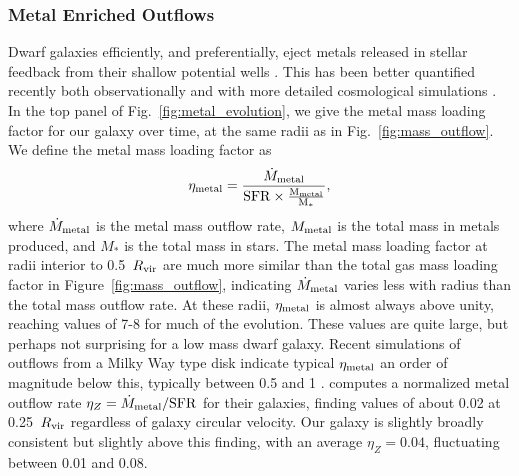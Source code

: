 \documentclass[twocolumn]{aastex61}
\begin{document}
\subsubsection{Metal Enriched Outflows}
Dwarf galaxies efficiently, and preferentially, eject metals released in stellar feedback from their shallow potential wells \citep{MacLowFerrara1999,FerraraTolstoy2000}. This has been better quantified recently both observationally \citep[e.g.][]{Kirby2011-metals,Zahid2012,Peeples2014,McQuinn2015} and with more detailed cosmological simulations \citep{Angles-Alcazar2017,Muratov2017}. In the top panel of Fig.~\ref{fig:metal_evolution}, we give the metal mass loading factor for our galaxy over time, at the same radii as in Fig.~\ref{fig:mass_outflow}. We define the metal mass loading factor as
\begin{equation}
\eta_{\rm metal} = \frac{\dot{M}_{\rm metal}}{\rm{SFR} \times \frac{M_{\rm metal}}{M_{*}}},
\end{equation}
where $\dot{M}_{\rm metal}$ is the metal mass outflow rate, $M_{\rm metal}$ is the total mass in metals produced, and $M_{*}$ is the total mass in stars. The metal mass loading factor at radii interior to 0.5~$R_{\rm vir}$ are much more similar than the total gas mass loading factor in Figure~\ref{fig:mass_outflow}, indicating $\dot{M}_{\rm metal}$ varies less with radius than the total mass outflow rate. At these radii, $\eta_{\rm metal}$ is almost always above unity, reaching values of 7-8 for much of the evolution. These values are quite large, but perhaps not surprising for a low mass dwarf galaxy. Recent simulations of outflows from a Milky Way type disk indicate typical $\eta_{\rm metal}$ an order of magnitude below this, typically between 0.5 and 1 \citep{Li2017,Fielding2017}. \cite{Muratov2017} computes a normalized metal outflow rate $\eta_{Z} = \dot{M}_{\rm metal}/{\rm SFR}$ for their galaxies, finding values of about 0.02 at 0.25~$R_{\rm vir}$ regardless of galaxy circular velocity. Our galaxy is slightly broadly consistent but slightly above this finding, with an average $\eta_Z = 0.04$, fluctuating between 0.01 and 0.08.
\end{document}
